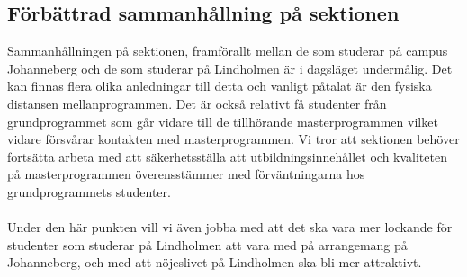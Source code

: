 \documentclass[11pt, noincludeaddress, nopagination]{classes/cthit}
\begin{document}
\subsection{Förbättrad sammanhållning på sektionen}
Sammanhållningen på sektionen, framförallt mellan de som studerar på campus Johanneberg och de som studerar på Lindholmen är i dagsläget undermålig. Det kan finnas flera olika anledningar till detta och vanligt påtalat är den fysiska distansen mellanprogrammen. Det är också relativt få studenter från grundprogrammet som går vidare till de tillhörande masterprogrammen vilket vidare försvårar kontakten med masterprogrammen. Vi tror att sektionen behöver fortsätta arbeta med att säkerhetsställa att utbildningsinnehållet och kvaliteten på masterprogrammen överensstämmer med förväntningarna hos grundprogrammets studenter. 
\\\\
Under den här punkten vill vi även jobba med att det ska vara mer lockande för studenter som studerar på Lindholmen att vara med på arrangemang på Johanneberg, och med att nöjeslivet på Lindholmen ska bli mer attraktivt.




\end{document}
